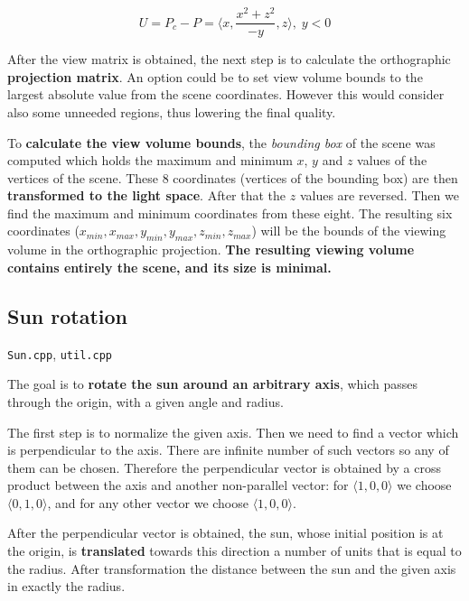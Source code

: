 \begin{equation}
\label{eq:up_down}
U       = P_c - P
        = \langle x, \frac{x^2 + z^2}{-y}, z\rangle
,\; y < 0
\end{equation}

After the view matrix is obtained, the next step is to calculate the orthographic \textbf{projection matrix}. An option could be to set view volume bounds to the largest absolute value from the scene coordinates. However this would consider also some unneeded regions, thus lowering the final quality.

To \textbf{calculate the view volume bounds}, the \textit{bounding box} of the scene was computed which holds the maximum and minimum $x$, $y$ and $z$ values of the vertices of the scene. These 8 coordinates (vertices of the bounding box) are then \textbf{transformed to the light space}. After that the $z$ values are reversed. Then we find the maximum and minimum coordinates from these eight. The resulting six coordinates ($x_{min}, x_{max}, y_{min}, y_{max}, z_{min}, z_{max}$) will be the bounds of the viewing volume in the orthographic projection. \textbf{The resulting viewing volume contains entirely the scene, and its size is minimal.}






\subsection{Sun rotation}

\verb|Sun.cpp|, \verb|util.cpp|

The goal is to \textbf{rotate the sun around an arbitrary axis}, which passes through the origin, with a given angle and radius.

The first step is to normalize the given axis. Then we need to find a vector which is perpendicular to the axis. There are infinite number of such vectors so any of them can be chosen. Therefore the perpendicular vector is obtained by a cross product between the axis and another non-parallel vector: for $\langle 1, 0, 0 \rangle$ we choose $\langle 0, 1, 0 \rangle$, and for any other vector we choose $\langle 1, 0, 0 \rangle$.

After the perpendicular vector is obtained, the sun, whose initial position is at the origin, is \textbf{translated} towards this direction a number of units that is equal to the radius. After transformation the distance between the sun and the given axis in exactly the radius.

